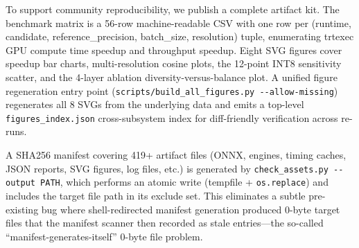 \documentclass[
]{article}
\begin{document}
To support community reproducibility, we publish a complete artifact
kit. The benchmark matrix is a 56-row machine-readable CSV with one row
per (runtime, candidate, reference\_precision, batch\_size, resolution)
tuple, enumerating trtexec GPU compute time speedup and throughput
speedup. Eight SVG figures cover speedup bar charts, multi-resolution
cosine plots, the 12-point INT8 sensitivity scatter, and the 4-layer
ablation diversity-versus-balance plot. A unified figure regeneration
entry point (\texttt{scripts/build\_all\_figures.py\ -\/-allow-missing})
regenerates all 8 SVGs from the underlying data and emits a top-level
\texttt{figures\_index.json} cross-subsystem index for diff-friendly
verification across re-runs.

A SHA256 manifest covering 419+ artifact files (ONNX, engines, timing
caches, JSON reports, SVG figures, log files, etc.) is generated by
\texttt{check\_assets.py\ -\/-output\ PATH}, which performs an atomic
write (tempfile + \texttt{os.replace}) and includes the target file path
in its exclude set. This eliminates a subtle pre-existing bug where
shell-redirected manifest generation produced 0-byte target files that
the manifest scanner then recorded as stale entries---the so-called
``manifest-generates-itself'' 0-byte file problem.
\end{document}
